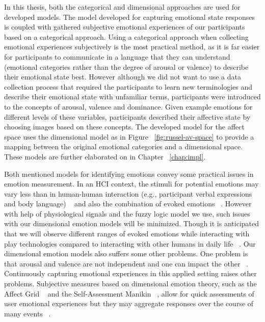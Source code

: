 In this thesis, both the categorical and dimensional approaches are used for developed models. The model developed for capturing emotional state responses is coupled with gathered subjective emotional experiences of our participants based on a categorical approach. Using a categorical approach when collecting emotional experiences subjectively is the most practical method, as it is far easier for participants to communicate in a language that they can understand (emotional categories rather than the degree of arousal or valence) to describe their emotional state best. However although we did not want to use a data collection process that required the participants to learn new terminologies and describe their emotional state with unfamiliar terms, participants were introduced to the concepts of arousal, valence and dominance. Given example emotions for different levels of these variables, participants described their affective state by choosing images based on these concepts. The developed model for the affect space uses the dimensional model as in Figure ~\ref{fig:russel-av-space} to provide a mapping between the original emotional categories and a dimensional space. These models are further elaborated on in Chapter ~\ref{chap:impl}.

Both mentioned models for identifying emotions convey some practical issues in emotion measurement. In an HCI context, the stimuli for potential emotions may vary less than in human-human interaction (e.g., participant verbal expressions and body language) ~\cite{zhang2010service} and also the combination of evoked emotions ~\cite{peter2006emotion}. However with help of physiological signals and the fuzzy logic model we use, such issues with our dimensional emotion models will be minimized. Though it is anticipated that we will observe different ranges of evoked emotions while interacting with play technologies compared to interacting with other humans in daily life ~\cite{zhang2010service}. Our dimensional emotion models also suffers some other problems. One problem is that arousal and valence are not independent and one can impact the other ~\cite{mandryk2007fuzzy}. Continuously capturing emotional experiences in this applied setting raises other problems. Subjective measures based on dimensional emotion theory, such as the Affect Grid ~\cite{russell1989affect} and the Self-Assessment Manikin ~\cite{bradley1994measuring}, allow for quick assessments of user emotional experiences but they may aggregate responses over the course of many events ~\cite{zhang2010service}.

